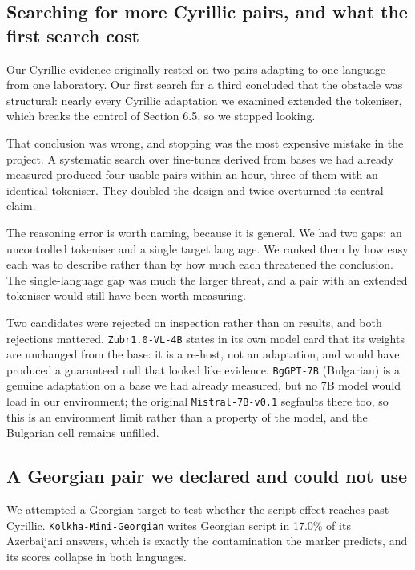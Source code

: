 \documentclass[final]{clv2025}
\begin{document}
\subsection{Searching for more Cyrillic pairs, and what the first search cost}

Our Cyrillic evidence originally rested on two pairs adapting to one language
from one laboratory. Our first search for a third concluded that the obstacle
was structural: nearly every Cyrillic adaptation we examined extended the
tokeniser, which breaks the control of Section 6.5, so we stopped looking.

That conclusion was wrong, and stopping was the most expensive mistake in the
project. A systematic search over fine-tunes derived from bases we had already
measured produced four usable pairs within an hour, three of them with an
identical tokeniser. They doubled the design and twice overturned its central
claim.

The reasoning error is worth naming, because it is general. We had two gaps: an
uncontrolled tokeniser and a single target language. We ranked them by how easy
each was to describe rather than by how much each threatened the conclusion.
The single-language gap was much the larger threat, and a pair with an extended
tokeniser would still have been worth measuring.

Two candidates were rejected on inspection rather than on results, and both
rejections mattered. \texttt{Zubr1.0-VL-4B} states in its own model card that
its weights are unchanged from the base: it is a re-host, not an adaptation,
and would have produced a guaranteed null that looked like evidence.
\texttt{BgGPT-7B} (Bulgarian) is a genuine adaptation on a base we had already
measured, but no 7B model would load in our environment; the original
\texttt{Mistral-7B-v0.1} segfaults there too, so this is an environment limit
rather than a property of the model, and the Bulgarian cell remains unfilled.

\subsection{A Georgian pair we declared and could not use}

We attempted a Georgian target to test whether the script effect reaches past
Cyrillic. \texttt{Kolkha-Mini-Georgian} writes Georgian script in 17.0\% of its
Azerbaijani answers, which is exactly the contamination the marker predicts,
and its scores collapse in both languages.
\end{document}
